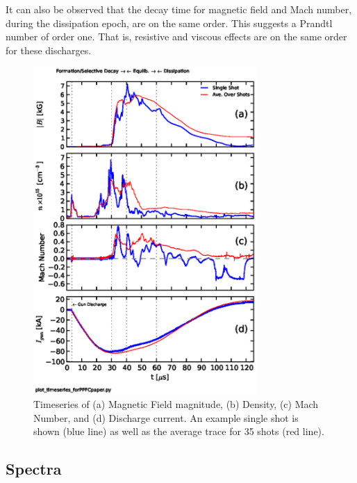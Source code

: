 \documentclass[12pt]{iopart}
\begin{document}
It can also be observed that the decay time for magnetic field and Mach number, during the dissipation epoch, are on the same order. This suggests a Prandtl number of order one. That is, resistive and viscous effects are on the same order for these discharges.

\begin{figure}[!htbp]
\centerline{
\includegraphics[width=8.5cm]{timeseries36.eps}}
\caption{\label{fig:timeseries36} Timeseries of (a) Magnetic Field magnitude, (b) Density, (c) Mach Number, and (d) Discharge current. An example single shot is shown (blue line) as well as the average trace for 35 shots (red line).}
\end{figure}

\subsection{Spectra}
\end{document}
